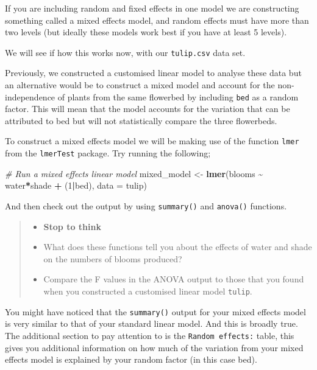 \documentclass[
]{book}
\newenvironment{Shaded}{\begin{snugshade}}{\end{snugshade}}
\newcommand{\AttributeTok}[1]{\textcolor[rgb]{0.13,0.29,0.53}{#1}}
\newcommand{\CommentTok}[1]{\textcolor[rgb]{0.56,0.35,0.01}{\textit{#1}}}
\newcommand{\DecValTok}[1]{\textcolor[rgb]{0.00,0.00,0.81}{#1}}
\newcommand{\FunctionTok}[1]{\textcolor[rgb]{0.13,0.29,0.53}{\textbf{#1}}}
\newcommand{\NormalTok}[1]{#1}
\newcommand{\OtherTok}[1]{\textcolor[rgb]{0.56,0.35,0.01}{#1}}
\newcommand{\SpecialCharTok}[1]{\textcolor[rgb]{0.81,0.36,0.00}{\textbf{#1}}}
\providecommand{\tightlist}{%
  \setlength{\itemsep}{0pt}\setlength{\parskip}{0pt}}
\begin{document}
If you are including random and fixed effects in one model we are constructing something called a mixed effects model, and random effects must have more than two levels (but ideally these models work best if you have at least 5 levels).

We will see if how this works now, with our \texttt{tulip.csv} data set.

Previously, we constructed a customised linear model to analyse these data but an alternative would be to construct a mixed model and account for the non-independence of plants from the same flowerbed by including \texttt{bed} as a random factor. This will mean that the model accounts for the variation that can be attributed to bed but will not statistically compare the three flowerbeds.

To construct a mixed effects model we will be making use of the function \texttt{lmer} from the \texttt{lmerTest} package. Try running the following;

\begin{Shaded}
\begin{Highlighting}[]
\CommentTok{\# Run a mixed effects linear model}
\NormalTok{mixed\_model }\OtherTok{\textless{}{-}} \FunctionTok{lmer}\NormalTok{(blooms }\SpecialCharTok{\textasciitilde{}}\NormalTok{ water}\SpecialCharTok{*}\NormalTok{shade }\SpecialCharTok{+}\NormalTok{ (}\DecValTok{1}\SpecialCharTok{|}\NormalTok{bed), }\AttributeTok{data =}\NormalTok{ tulip)}
\end{Highlighting}
\end{Shaded}

And then check out the output by using \texttt{summary()} and \texttt{anova()} functions.

\begin{quote}
\begin{itemize}
\tightlist
\item
  \textbf{Stop to think}
\item
  What does these functions tell you about the effects of water and shade on the numbers of blooms produced?
\item
  Compare the F values in the ANOVA output to those that you found when you constructed a customised linear model \texttt{tulip}.
\end{itemize}
\end{quote}

You might have noticed that the \texttt{summary()} output for your mixed effects model is very similar to that of your standard linear model. And this is broadly true. The additional section to pay attention to is the \texttt{Random\ effects:} table, this gives you additional information on how much of the variation from your mixed effects model is explained by your random factor (in this case bed).
\end{document}
